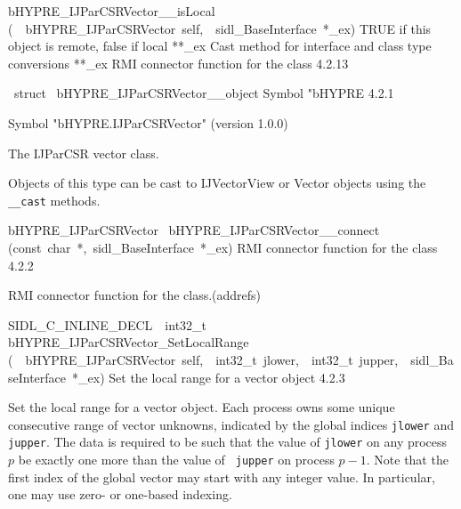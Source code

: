 \documentclass{article}
\begin{document}
\begin{cxxentry}
\begin{cxxentry}
\begin{cxxnames}
        {}
\label{cxx.4.2.30}
        {bHYPRE\_IJParCSRVector\_\_isLocal}
        {(\ \ bHYPRE\_IJParCSRVector\ self,\ \ sidl\_BaseInterface\ *\_ex)}
        {
TRUE if this object is remote, false if local}
        {}
\label{cxx.4.2.31}
        {**\_ex}
        {}
        {
Cast method for interface and class type conversions}
        {}
\label{cxx.4.2.32}
        {**\_ex}
        {}
        {
RMI connector function for the class}
        {4.2.13}
\end{cxxnames}
\begin{cxxvariable}
{\ struct\ }
        {bHYPRE\_IJParCSRVector\_\_object}
        {}
        {
Symbol "bHYPRE}
        {4.2.1}
\begin{cxxdoc}

Symbol "bHYPRE.IJParCSRVector" (version 1.0.0)

The IJParCSR vector class.

Objects of this type can be cast to IJVectorView or Vector
objects using the {\tt \_\_cast} methods.
\end{cxxdoc}
\end{cxxvariable}
\begin{cxxfunction}
{bHYPRE\_IJParCSRVector\ }
        {bHYPRE\_IJParCSRVector\_\_connect}
        {(const\ char\ *,\ sidl\_BaseInterface\ *\_ex)}
        {
RMI connector function for the class}
        {4.2.2}
\begin{cxxdoc}

RMI connector function for the class.(addrefs)
\end{cxxdoc}
\end{cxxfunction}
\begin{cxxfunction}
{SIDL\_C\_INLINE\_DECL\ \ int32\_t\ }
        {bHYPRE\_IJParCSRVector\_SetLocalRange}
        {(\ \ bHYPRE\_IJParCSRVector\ self,\ \ int32\_t\ jlower,\ \ int32\_t\ jupper,\ \ sidl\_BaseInterface\ *\_ex)}
        {
Set the local range for a vector object}
        {4.2.3}
\begin{cxxdoc}

Set the local range for a vector object.  Each process owns
some unique consecutive range of vector unknowns, indicated
by the global indices {\tt jlower} and {\tt jupper}.  The
data is required to be such that the value of {\tt jlower} on
any process $p$ be exactly one more than the value of {\tt
jupper} on process $p-1$.  Note that the first index of the
global vector may start with any integer value.  In
particular, one may use zero- or one-based indexing.


\end{cxxdoc}
\end{cxxfunction}
\end{cxxentry}
\end{cxxentry}
\end{document}

